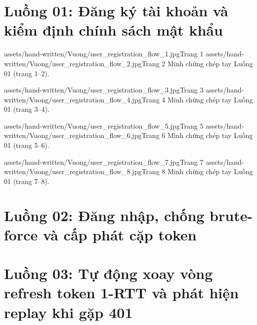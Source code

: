 \clearpage

\section{Luồng 01: Đăng ký tài khoản và kiểm định chính sách mật khẩu}\label{sec:app-flow-01}
\par\smallskip

\handwrittenpair
    {assets/hand-written/Vuong/user_registration_flow_1.jpg}{Trang 1}
    {assets/hand-written/Vuong/user_registration_flow_2.jpg}{Trang 2}
    {Minh chứng chép tay Luồng 01 (trang 1--2).}

\handwrittenpair
    {assets/hand-written/Vuong/user_registration_flow_3.jpg}{Trang 3}
    {assets/hand-written/Vuong/user_registration_flow_4.jpg}{Trang 4}
    {Minh chứng chép tay Luồng 01 (trang 3--4).}

\handwrittenpair
    {assets/hand-written/Vuong/user_registration_flow_5.jpg}{Trang 5}
    {assets/hand-written/Vuong/user_registration_flow_6.jpg}{Trang 6}
    {Minh chứng chép tay Luồng 01 (trang 5--6).}

\handwrittenpair
    {assets/hand-written/Vuong/user_registration_flow_7.jpg}{Trang 7}
    {assets/hand-written/Vuong/user_registration_flow_8.jpg}{Trang 8}
    {Minh chứng chép tay Luồng 01 (trang 7--8).}

\clearpage

\section{Luồng 02: Đăng nhập, chống brute-force và cấp phát cặp token}\label{sec:app-flow-02}
\par\smallskip


\section{Luồng 03: Tự động xoay vòng refresh token 1-RTT và phát hiện replay khi gặp 401}\label{sec:app-flow-03}
\par\smallskip

